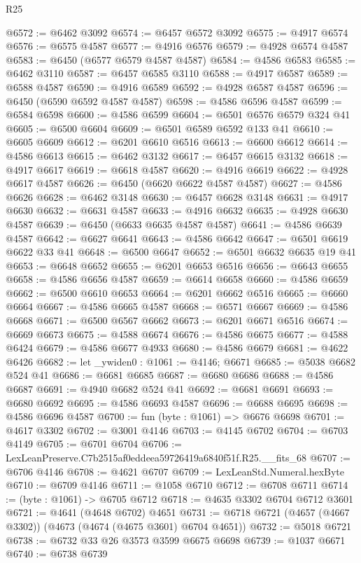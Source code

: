 \begin{lexlean}{R25}
\begin{coremodule}
@6572 := @6462 @3092
@6574 := @6457 @6572 @3092
@6575 := @4917 @6574
@6576 := @6575 @4587
@6577 := @4916 @6576
@6579 := @4928 @6574 @4587
@6583 := @6450 (@6577 @6579 @4587 @4587)
@6584 := @4586 @6583
@6585 := @6462 @3110
@6587 := @6457 @6585 @3110
@6588 := @4917 @6587
@6589 := @6588 @4587
@6590 := @4916 @6589
@6592 := @4928 @6587 @4587
@6596 := @6450 (@6590 @6592 @4587 @4587)
@6598 := @4586 @6596 @4587
@6599 := @6584 @6598
@6600 := @4586 @6599
@6604 := @6501 @6576 @6579 @324 @41
@6605 := @6500 @6604
@6609 := @6501 @6589 @6592 @133 @41
@6610 := @6605 @6609
@6612 := @6201 @6610 @6516
@6613 := @6600 @6612
@6614 := @4586 @6613
@6615 := @6462 @3132
@6617 := @6457 @6615 @3132
@6618 := @4917 @6617
@6619 := @6618 @4587
@6620 := @4916 @6619
@6622 := @4928 @6617 @4587
@6626 := @6450 (@6620 @6622 @4587 @4587)
@6627 := @4586 @6626
@6628 := @6462 @3148
@6630 := @6457 @6628 @3148
@6631 := @4917 @6630
@6632 := @6631 @4587
@6633 := @4916 @6632
@6635 := @4928 @6630 @4587
@6639 := @6450 (@6633 @6635 @4587 @4587)
@6641 := @4586 @6639 @4587
@6642 := @6627 @6641
@6643 := @4586 @6642
@6647 := @6501 @6619 @6622 @33 @41
@6648 := @6500 @6647
@6652 := @6501 @6632 @6635 @19 @41
@6653 := @6648 @6652
@6655 := @6201 @6653 @6516
@6656 := @6643 @6655
@6658 := @4586 @6656 @4587
@6659 := @6614 @6658
@6660 := @4586 @6659
@6662 := @6500 @6610 @6653
@6664 := @6201 @6662 @6516
@6665 := @6660 @6664
@6667 := @4586 @6665 @4587
@6668 := @6571 @6667
@6669 := @4586 @6668
@6671 := @6500 @6567 @6662
@6673 := @6201 @6671 @6516
@6674 := @6669 @6673
@6675 := @4588 @6674
@6676 := @4586 @6675
@6677 := @4588 @6424
@6679 := @4586 @6677 @4933
@6680 := @4586 @6679
@6681 := @4622 @6426
@6682 := let _ywiden0 : @1061 := @4146; @6671
@6685 := @5038 @6682 @524 @41
@6686 := @6681 @6685
@6687 := @6680 @6686
@6688 := @4586 @6687
@6691 := @4940 @6682 @524 @41
@6692 := @6681 @6691
@6693 := @6680 @6692
@6695 := @4586 @6693 @4587
@6696 := @6688 @6695
@6698 := @4586 @6696 @4587
@6700 := fun (byte : @1061) => @6676 @6698
@6701 := @4617 @3302
@6702 := @3001 @4146
@6703 := @4145 @6702
@6704 := @6703 @4149
@6705 := @6701 @6704
@6706 := LexLeanPreserve.C7b2515af0eddeea59726419a6840f51f.R25.__fits_68
@6707 := @6706 @4146
@6708 := @4621 @6707
@6709 := LexLeanStd.Numeral.hexByte
@6710 := @6709 @4146
@6711 := @1058 @6710
@6712 := @6708 @6711
@6714 := (byte : @1061) -> @6705 @6712
@6718 := @4635 @3302 @6704 @6712 @3601
@6721 := @4641 (@4648 @6702) @4651
@6731 := @6718 @6721 (@4657 (@4667 @3302)) (@4673 (@4674 (@4675 @3601) @6704 @4651))
@6732 := @5018 @6721
@6738 := @6732 @33 @26 @3573 @3599 @6675 @6698
@6739 := @1037 @6671
@6740 := @6738 @6739

\end{coremodule}
\end{lexlean}
